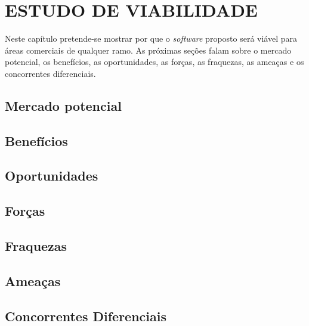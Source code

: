 \chapter{ESTUDO DE VIABILIDADE} \label{estudo}

Neste capítulo pretende-se mostrar por que o \textit{software} proposto será viável para áreas comerciais de qualquer ramo. 
As próximas seções falam sobre o mercado potencial, os benefícios, as oportunidades, as forças, as fraquezas,
 as ameaças e os concorrentes diferenciais.

\section{Mercado potencial}

\section{Benefícios}

\section{Oportunidades}

\section{Forças}

\section{Fraquezas}


\section{Ameaças}


\section{Concorrentes Diferenciais}

